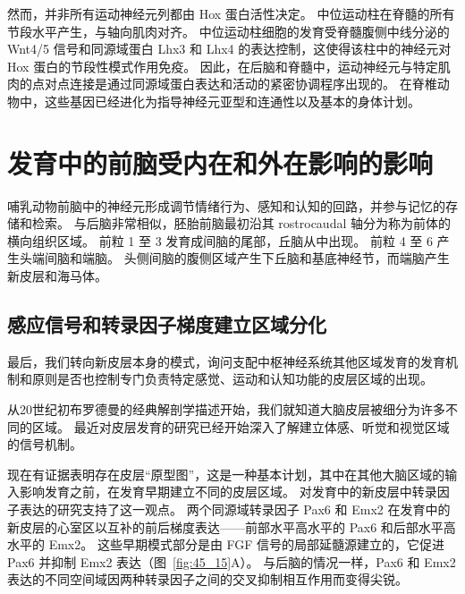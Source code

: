 然而，并非所有运动神经元列都由 Hox 蛋白活性决定。
中位运动柱在脊髓的所有节段水平产生，与轴向肌肉对齐。
中位运动柱细胞的发育受脊髓腹侧中线分泌的 Wnt4/5 信号和同源域蛋白 Lhx3 和 Lhx4 的表达控制，这使得该柱中的神经元对 Hox 蛋白的节段性模式作用免疫。
因此，在后脑和脊髓中，运动神经元与特定肌肉的点对点连接是通过同源域蛋白表达和活动的紧密协调程序出现的。
在脊椎动物中，这些基因已经进化为指导神经元亚型和连通性以及基本的身体计划。



\section{发育中的前脑受内在和外在影响的影响}

哺乳动物前脑中的神经元形成调节情绪行为、感知和认知的回路，并参与记忆的存储和检索。
与后脑非常相似，胚胎前脑最初沿其 rostrocaudal 轴分为称为前体的横向组织区域。
前粒 1 至 3 发育成间脑的尾部，丘脑从中出现。
前粒 4 至 6 产生头端间脑和端脑。
头侧间脑的腹侧区域产生下丘脑和基底神经节，而端脑产生新皮层和海马体。



\subsection{感应信号和转录因子梯度建立区域分化}

最后，我们转向新皮层本身的模式，询问支配中枢神经系统其他区域发育的发育机制和原则是否也控制专门负责特定感觉、运动和认知功能的皮层区域的出现。


从20世纪初布罗德曼的经典解剖学描述开始，我们就知道大脑皮层被细分为许多不同的区域。
最近对皮层发育的研究已经开始深入了解建立体感、听觉和视觉区域的信号机制。


现在有证据表明存在皮层“原型图”，这是一种基本计划，其中在其他大脑区域的输入影响发育之前，在发育早期建立不同的皮层区域。
对发育中的新皮层中转录因子表达的研究支持了这一观点。
两个同源域转录因子 Pax6 和 Emx2 在发育中的新皮层的心室区以互补的前后梯度表达——前部水平高水平的 Pax6 和后部水平高水平的 Emx2。
这些早期模式部分是由 FGF 信号的局部延髓源建立的，它促进 Pax6 并抑制 Emx2 表达（图~\ref{fig:45_15}A）。
与后脑的情况一样，Pax6 和 Emx2 表达的不同空间域因两种转录因子之间的交叉抑制相互作用而变得尖锐。


